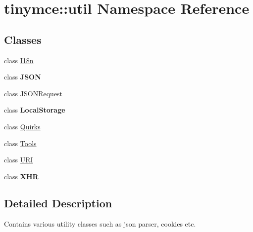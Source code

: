 \hypertarget{namespacetinymce_1_1util}{\section{tinymce\+:\+:util Namespace Reference}
\label{namespacetinymce_1_1util}
}
\subsection*{Classes}
\begin{DoxyCompactItemize}
\item 
class \hyperlink{classtinymce_1_1util_1_1_i18n}{I18n}
\item 
class {\bfseries J\+S\+O\+N}
\item 
class \hyperlink{classtinymce_1_1util_1_1_j_s_o_n_request}{J\+S\+O\+N\+Request}
\item 
class {\bfseries Local\+Storage}
\item 
class \hyperlink{classtinymce_1_1util_1_1_quirks}{Quirks}
\item 
class \hyperlink{classtinymce_1_1util_1_1_tools}{Tools}
\item 
class \hyperlink{classtinymce_1_1util_1_1_u_r_i}{U\+R\+I}
\item 
class {\bfseries X\+H\+R}
\end{DoxyCompactItemize}


\subsection{Detailed Description}
Contains various utility classes such as json parser, cookies etc. 
